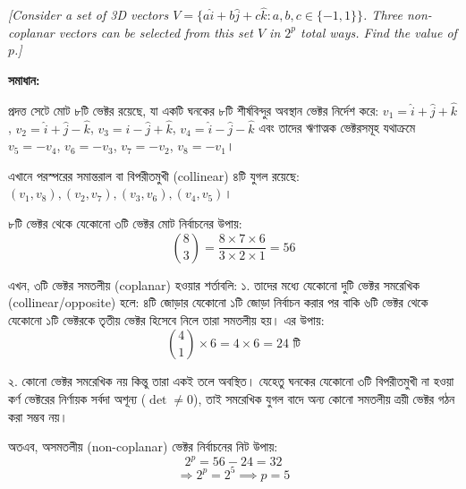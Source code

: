 \documentclass[11pt,a4paper]{article}
\begin{document}
\smallskip
\textit{[Consider a set of 3D vectors $V = \{a\hat{i}+b\hat{j}+c\hat{k} : a, b, c \in \{-1, 1\}\}$. Three non-coplanar vectors can be selected from this set $V$ in $2^p$ total ways. Find the value of $p$.]}

\vspace{0.3cm}
\begin{center}
\end{center}

\textbf{সমাধান:}

প্রদত্ত সেটে মোট ৮টি ভেক্টর রয়েছে, যা একটি ঘনকের ৮টি শীর্ষবিন্দুর অবস্থান ভেক্টর নির্দেশ করে: $v_1 = \hat{i}+\hat{j}+\hat{k}$, $v_2 = \hat{i}+\hat{j}-\hat{k}$, $v_3 = \hat{i}-\hat{j}+\hat{k}$, $v_4 = \hat{i}-\hat{j}-\hat{k}$ এবং তাদের ঋণাত্মক ভেক্টরসমূহ যথাক্রমে $v_5 = -v_4$, $v_6 = -v_3$, $v_7 = -v_2$, $v_8 = -v_1$।

এখানে পরস্পরের সমান্তরাল বা বিপরীতমুখী (collinear) ৪টি যুগল রয়েছে: $(v_1, v_8), (v_2, v_7), (v_3, v_6), (v_4, v_5)$।

৮টি ভেক্টর থেকে যেকোনো ৩টি ভেক্টর মোট নির্বাচনের উপায়:
$$\binom{8}{3} = \frac{8 \times 7 \times 6}{3 \times 2 \times 1} = 56$$

এখন, ৩টি ভেক্টর সমতলীয় (coplanar) হওয়ার শর্তাবলি:
১. তাদের মধ্যে যেকোনো দুটি ভেক্টর সমরেখিক (collinear/opposite) হলে: ৪টি জোড়ার যেকোনো ১টি জোড়া নির্বাচন করার পর বাকি ৬টি ভেক্টর থেকে যেকোনো ১টি ভেক্টরকে তৃতীয় ভেক্টর হিসেবে নিলে তারা সমতলীয় হয়। এর উপায়:
$$\binom{4}{1} \times 6 = 4 \times 6 = 24\text{ টি}$$

২. কোনো ভেক্টর সমরেখিক নয় কিন্তু তারা একই তলে অবস্থিত। যেহেতু ঘনকের যেকোনো ৩টি বিপরীতমুখী না হওয়া কর্ণ ভেক্টরের নির্ণায়ক সর্বদা অশূন্য ($\det \neq 0$), তাই সমরেখিক যুগল বাদে অন্য কোনো সমতলীয় ত্রয়ী ভেক্টর গঠন করা সম্ভব নয়।

অতএব, অসমতলীয় (non-coplanar) ভেক্টর নির্বাচনের নিট উপায়:
$$2^p = 56 - 24 = 32$$
$$\Rightarrow 2^p = 2^5 \implies p = 5$$
\end{document}

